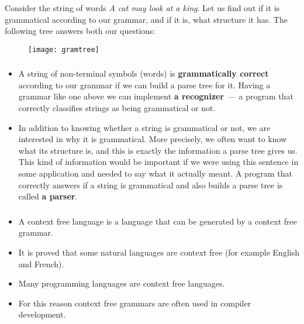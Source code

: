 \begin{frame}
	\frametitle{\insertsection}
	
	Consider the string of words \textit{A cat may look at a king}. Let us find out if it is grammatical according to our grammar, and if it is, what structure it has.
	The following tree answers both our questions:
	
	\begin{figure}
		\texttt{[image: gramtree]}
	\end{figure}
	
\end{frame}


\begin{frame}
	\frametitle{\insertsection}
	
	\begin{itemize}
		\item A string of non-terminal symbols (words) is \textbf{grammatically correct} according to our grammar if we can build a parse tree for it. Having a grammar like one above we can
		implement \textbf{a recognizer}~--- a program that correctly classifies strings as being grammatical or not.
		\item In addition to knowing whether a string is grammatical or not, we are interested in why it is grammatical. More precisely, we often want to know what its structure is, and this is exactly the information a parse tree gives us. This kind of information would be important if we were using this sentence in some application and needed to say what it actually meant.
		A program that correctly answers if a string is grammatical and also builds a parse tree is called \textbf{a parser}.
	\end{itemize}
\end{frame}


\begin{frame}
	\frametitle{\insertsection}
	
	\begin{itemize}
		\item A context free language is a language that can be generated by a context free grammar.
		\item It is proved that some natural languages are context free (for example English and French).
		\item Many programming languages are context free languages.
		\item For this reason context free grammars are often used in compiler development.
	\end{itemize}
\end{frame}


